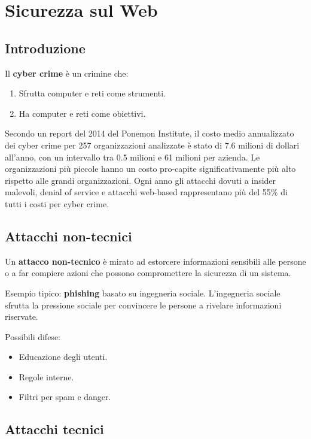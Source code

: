 \chapter{Sicurezza sul Web}

\section{Introduzione}

Il \textbf{cyber crime} è un crimine che:

\begin{enumerate}
    \item Sfrutta computer e reti come strumenti.
    \item Ha computer e reti come obiettivi.
\end{enumerate}

Secondo un report del 2014 del Ponemon Institute, il costo medio annualizzato dei cyber crime per 257 organizzazioni analizzate è stato di 7.6 milioni di dollari all'anno, con un intervallo tra 0.5 milioni e 61 milioni per azienda. Le organizzazioni più piccole hanno un costo pro-capite significativamente più alto rispetto alle grandi organizzazioni. Ogni anno gli attacchi dovuti a insider malevoli, denial of service e attacchi web-based rappresentano più del 55\% di tutti i costi per cyber crime.

\section{Attacchi non-tecnici}

Un \textbf{attacco non-tecnico} è mirato ad estorcere informazioni sensibili alle persone o a far compiere azioni che possono compromettere la sicurezza di un sistema.

Esempio tipico: \textbf{phishing} basato su ingegneria sociale. L'ingegneria sociale sfrutta la pressione sociale per convincere le persone a rivelare informazioni riservate.

Possibili difese:

\begin{itemize}
    \item Educazione degli utenti.
    \item Regole interne.
    \item Filtri per spam e danger.
\end{itemize}

\section{Attacchi tecnici}

